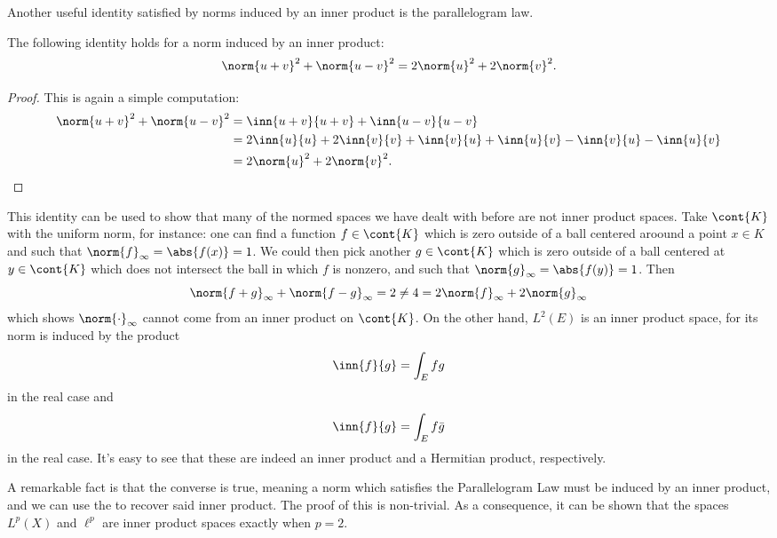 \documentclass[12pt,oneside]{book}
\begin{document}
Another useful identity satisfied by norms induced by an inner product is the
parallelogram law.
\begin{theorem}\label{theo:parallelogram}
	The following identity holds for a norm induced by an inner product:
	\begin{equation*}
		\norm{u+v}^2 + \norm{u-v}^2 = 2\norm{u}^2 + 2\norm{v}^2.
	\end{equation*}
\end{theorem}
\begin{proof}
	This is again a simple computation:
	\begin{align*}
		\norm{u+v}^2 + \norm{u-v}^2 & = \inn{u+v}{u+v} + \inn{u-v}{u-v} \\
																& = 2\inn{u}{u} + 2\inn{v}{v}+ \inn{v}{u} + \inn{u}{v} -
																\inn{v}{u} - \inn{u}{v} \\
																& = 2\norm{u}^2 + 2\norm{v}^2.
	\end{align*}
\end{proof}

This identity can be used to show that many of the normed spaces we have dealt with before
are not inner product spaces. Take \( \cont{K} \) with the uniform norm, for instance: one
can find a function \( f \in \cont{K} \) which is zero outside of a ball centered aroound
a point \( x \in K \) and such that \( \norm{f}_\infty = \abs{f(x)} = 1 \). We could then
pick another \( g \in \cont{K} \) which is zero outside of a ball centered at \( y \in
\cont{K} \) which does not intersect the ball in which \( f \) is nonzero, and such that
\( \norm{g}_\infty = \abs{f(y)} = 1 \). Then
\begin{equation*}
	\norm{f + g}_\infty + \norm{f - g}_\infty = 2 \neq 4 = 2\norm{f}_\infty + 2
	\norm{g}_\infty
\end{equation*}
which shows \( \norm{\cdot}_\infty \) cannot come from an inner product on \( \cont{K}
\). On the other hand, \( L^2(E) \) is an inner product space, for its norm is induced by
the product
\begin{equation*}
	\inn{f}{g} = \int_E fg
\end{equation*}
in the real case and 
\begin{equation*}
	\inn{f}{g} = \int_E f\bar{g}
\end{equation*}
in the real case. It's easy to see that these are indeed an inner product and a Hermitian
product, respectively.

A remarkable fact is that the converse is true, meaning a norm which satisfies the
Parallelogram Law must be induced by an inner product, and we can use the
 to recover said inner product. The proof of this is
non-trivial. As a consequence, it can be shown that the spaces \( L^p(X) \) and \( \ell^p
\) are inner product spaces exactly when \( p = 2 \).
\end{document}
